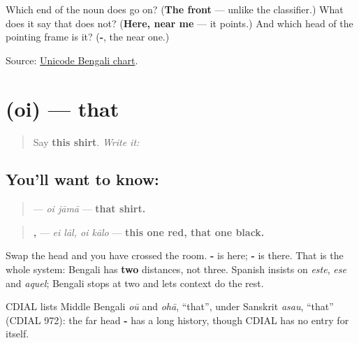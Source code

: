 \begin{tcolorbox}[breakable,colback=teal!4,colframe=teal!35!black,title={Before you move on}]
Which end of the noun does \textbf{} go on? (\textbf{The front} — unlike the classifier.) What does it say that \textbf{} does not? (\textbf{Here, near me} — it points.) And which head of the pointing frame is it? (\textbf{-}, the near one.)

Source: \href{https://www.unicode.org/charts/PDF/U0980.pdf}{Unicode Bengali chart}.
\end{tcolorbox}
\section[\texorpdfstring{\bn{ওই} (oi)}{ওই (oi)}]{ (oi) — that}

\label{lesson:BN-C21-oi}



\begin{quote}
Say \textbf{this shirt}. \emph{Write it:} \textbf{}
\end{quote}

\subsection*{You'll want to know: }
\begin{quote}
\textbf{ } — \emph{oi jāmā} — \textbf{that shirt.}
\end{quote}

\begin{quote}
\textbf{ ,  } — \emph{ei lāl, oi kālo} — \textbf{this one red, that one black.}
\end{quote}

Swap the head and you have crossed the room. \textbf{-} is here; \textbf{-} is there. That is the whole system: Bengali has \textbf{two} distances, not three. Spanish insists on \emph{este}, \emph{ese} and \emph{aquel}; Bengali stops at two and lets context do the rest.

\begin{cousinweb}
CDIAL lists Middle Bengali \emph{oū} and \emph{ohā}, \textquotedblleft{}that\textquotedblright{}, under Sanskrit \emph{asau}, \textquotedblleft{}that\textquotedblright{} (CDIAL 972): the far head \textbf{-} has a long history, though CDIAL has no entry for \textbf{} itself.
\end{cousinweb}

